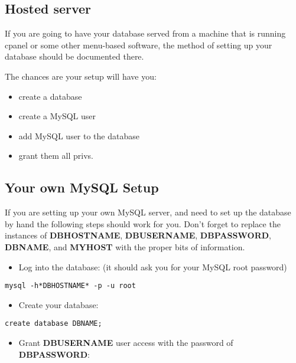 \documentclass[tablesignature]{scrartcl}
\begin{document}
\subsection{Hosted server}
\label{sec-4_1}

  If you are going to have your database served from a machine that
  is running cpanel or some other menu-based software, the method of
  setting up your database should be documented there.

  The chances are your setup will have you:
\begin{itemize}
\item create a database
\item create a MySQL user
\item add MySQL user to the database
\item grant them all privs.
\end{itemize}
\subsection{Your own MySQL Setup}
\label{sec-4_2}

   If you are setting up your own MySQL server, and need to set up the
   database by hand the following steps should work for you.  Don't
   forget to replace the instances of \textbf{DBHOSTNAME}, \textbf{DBUSERNAME},
   \textbf{DBPASSWORD}, \textbf{DBNAME}, and \textbf{MYHOST} with the proper bits of information.

\begin{itemize}
\item Log into the database: (it should ask you for your MySQL root password)
\end{itemize}

\begin{verbatim}
mysql -h*DBHOSTNAME* -p -u root
\end{verbatim}


\begin{itemize}
\item Create your database:
\end{itemize}

\begin{verbatim}
create database DBNAME;
\end{verbatim}


\begin{itemize}
\item Grant \textbf{DBUSERNAME} user access with the password of \textbf{DBPASSWORD}:
\end{itemize}
\end{document}
